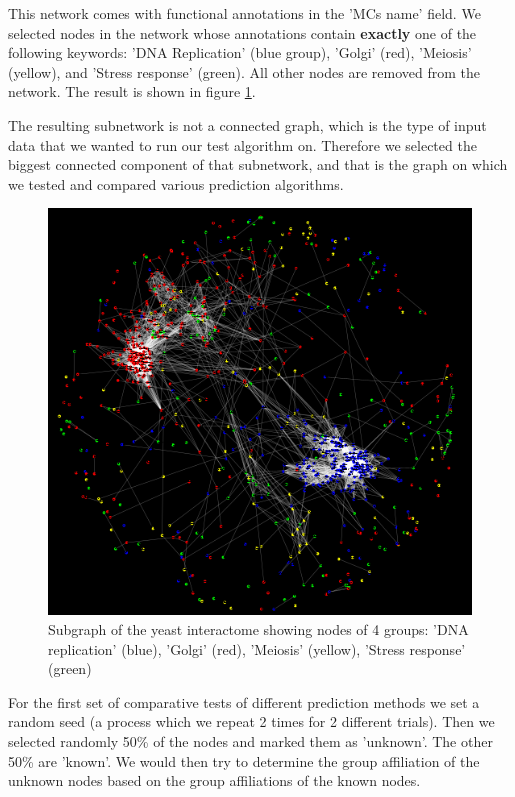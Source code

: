 This network comes with functional annotations in the 'MCs name' field.
We selected nodes in the network whose annotations contain
\textbf{exactly} one of the following keywords:  'DNA Replication' (blue
group), 'Golgi' (red), 'Meiosis' (yellow), and 'Stress response'
(green). All other nodes are removed from the network.  The result is
shown in figure \ref{fig:yeast_subgraph_4groups}.

The resulting subnetwork is not a connected graph, which is the type
of input data that we wanted to run our test algorithm on. Therefore
we selected the biggest connected component of that subnetwork, and
that is the graph on which we tested and compared various prediction
algorithms.

\begin{figure}
\begin{framed}
\centering
\includegraphics[width=\textwidth]{figures/yeastsubgraph_4_groups_colorcode.png}
\caption{Subgraph of the yeast interactome showing nodes of 4 groups: 'DNA
replication' (blue), 'Golgi' (red), 'Meiosis' (yellow), 'Stress response'
(green)}
\label{fig:yeast_subgraph_4groups}
\end{framed}
\end{figure}

For the first set of comparative tests of different prediction
methods 
we set a random seed (a process which we repeat 2 times for 2 different trials).
Then we selected randomly 50\% of the nodes and marked them as 'unknown'. The other
50\% are 'known'. We would then try to determine the group affiliation of the
unknown nodes based on the group affiliations of the known nodes.

